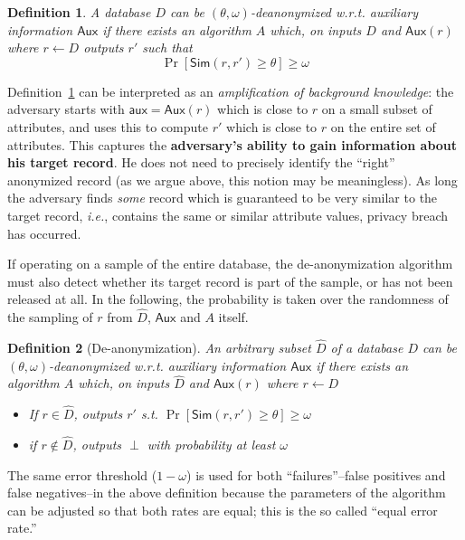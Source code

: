 \documentclass[11pt]{article}
\newcommand{\ie}{\emph{i.e.}}
\newcommand{\Sim}{\textsf{Sim}}
\newcommand{\Aux}{\textsf{Aux}}
\newcommand{\aux}{\textsf{aux}}
\newtheorem{definition}{Definition}
\begin{document}
\begin{definition}
\label{def:anp}
A database $D$ can be $(\theta, \omega)$-deanonymized w.r.t. auxiliary
information $\Aux$ if there exists an algorithm $A$ which, on inputs $D$
and $\Aux(r)$ where $r \leftarrow D$ outputs $r'$ such that 
$$\Pr[\Sim(r, r') \geq \theta] \geq \omega$$
\end{definition}

Definition~\ref{def:anp} can be interpreted as an \emph{amplification
of background knowledge}: the adversary starts with $\aux=\Aux(r)$
which is close to $r$ on a small subset of attributes, and uses this
to compute $r'$ which is close to $r$ on the entire set of attributes.
This captures the \textbf{adversary's ability to gain information about
his target record}.  He does not need to precisely identify the ``right''
anonymized record (as we argue above, this notion may be meaningless).
As long the adversary finds \emph{some} record which is guaranteed to
be very similar to the target record, \ie, contains the same or similar
attribute values, privacy breach has occurred.

If operating on a sample of the entire database, the de-anonymization
algorithm must also detect whether its target record is part of
the sample, or has not been released at all.  In the following, the
probability is taken over the randomness of the sampling of $r$ from
${\hat D}$, $\Aux$ and $A$ itself.

\begin{definition}[De-anonymization]
\label{def:anps}
An arbitrary subset ${\hat D}$ of a database $D$ can be $(\theta,
\omega)$-deanonymized w.r.t. auxiliary information $\Aux$ if there
exists an algorithm $A$ which, on inputs ${\hat D}$ and $\Aux(r)$ where
$r \leftarrow D$
\begin{itemize}
\item
If $ r \in {\hat D}$, outputs 
$r'$ s.t. $\Pr[\Sim(r, r') \geq \theta] \geq \omega$
\item
if $r \notin {\hat D}$, outputs $\perp$ with probability at least $\omega$
\end{itemize}
\end{definition}

The same error threshold ($1-\omega$) is used for both ``failures''--false
positives and false negatives--in the above definition because the
parameters of the algorithm can be adjusted so that both rates are equal;
this is the so called ``equal error rate.''

\end{document}
